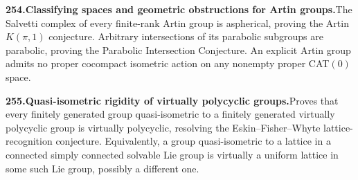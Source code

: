 \documentclass[11pt,a4paper]{article}
\begin{document}
  \par \begin{minipage}{\linewidth}
  \fontsize{10.5}{12.6}\selectfont\RaggedRight
  \hypertarget{result 254}{}
  {\bfseries\textcolor{muted}{254.}\enspace Classifying spaces and geometric obstructions for Artin groups.}\enspace The Salvetti complex of every finite-rank Artin group is aspherical, proving the Artin $K(\pi,1)$ conjecture. Arbitrary intersections of its parabolic subgroups are parabolic, proving the Parabolic Intersection Conjecture. An explicit Artin group admits no proper cocompact isometric action on any nonempty proper CAT$(0)$ space.\par
  \end{minipage}\par\vspace{5pt}



  \par \begin{minipage}{\linewidth}
  \fontsize{10.5}{12.6}\selectfont\RaggedRight
  \hypertarget{result 255}{}
  {\bfseries\textcolor{muted}{255.}\enspace Quasi-isometric rigidity of virtually polycyclic groups.}\enspace Proves that every finitely generated group quasi-isometric to a finitely generated virtually polycyclic group is virtually polycyclic, resolving the Eskin--Fisher--Whyte lattice-recognition conjecture. Equivalently, a group quasi-isometric to a lattice in a connected simply connected solvable Lie group is virtually a uniform lattice in some such Lie group, possibly a different one.\par
  \end{minipage}\par\vspace{5pt}
\end{document}
